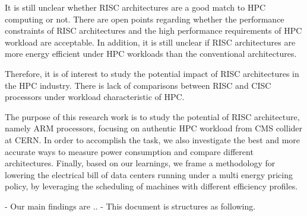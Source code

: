 It is still unclear whether RISC architectures are a good match to HPC
computing or not. There are open points regarding whether the performance 
constraints of RISC architectures and the high performance requirements of HPC 
workload are acceptable. In addition, it is still unclear if RISC architectures
are more energy efficient under HPC workloads than the conventional
architectures.

Therefore, it is of interest to study the potential impact of RISC architectures in 
the HPC industry. There is lack of comparisons between RISC and CISC processors
under workload characteristic of HPC.

The purpose of this research work is to study the potential of RISC
architecture, namely ARM processors, focusing on authentic HPC workload from
CMS collider at CERN. In order to accomplish the task, we also investigate the best
and more accurate ways to measure power consumption and compare different
architectures. Finally, based on our learnings, we frame a methodology for
lowering the electrical bill of data centers running under a multi energy
pricing policy, by leveraging the scheduling of machines with different
efficiency profiles.  
   
- Our main findings are ..
- This document is structures as following. 
